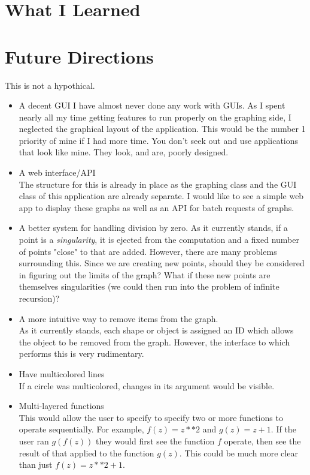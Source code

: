 \documentclass{article}
\begin{document}
\section{What I Learned}
\section{Future Directions}
    This is not a hypothical.
    \begin{itemize}
        \item A decent GUI
            I have almost never done any work with GUIs. As I spent nearly all my time getting features to run properly on the graphing side, I neglected the graphical layout of the application. This would be the number 1 priority of mine if I had more time. You don't seek out and use applications that look like mine. They look, and are, poorly designed.
        \item A web interface/API\\
            The structure for this is already in place as the graphing class and the GUI class of this application are already separate. I would like to see a simple web app to display these graphs as well as an API for batch requests of graphs.
        \item A better system for handling division by zero.
            As it currently stands, if a point is a \textit{singularity}, it is ejected from the computation and a fixed number of points "close" to that are added. However, there are many problems surrounding this. Since we are creating new points, should they be considered in figuring out the limits of the graph? What if these new points are themselves singularities (we could then run into the problem of infinite recursion)?
        \item A more intuitive way to remove items from the graph.\\
            As it currently stands, each shape or object is assigned an ID which allows the object to be removed from the graph. However, the interface to which performs this is very rudimentary.
        \item Have multicolored lines\\
            If a circle was multicolored, changes in its argument would be visible.
        \item Multi-layered functions\\
            This would allow the user to specify to specify two or more functions to operate sequentially. For example, $f(z) = z**2$ and $g(z) = z + 1$. If the user ran $g(f(z))$ they would first see the function $f$ operate, then see the result of that applied to the function $g(z)$. This could be much more clear than just $f(z) = z**2 + 1$.
    \end{itemize}
\end{document}

